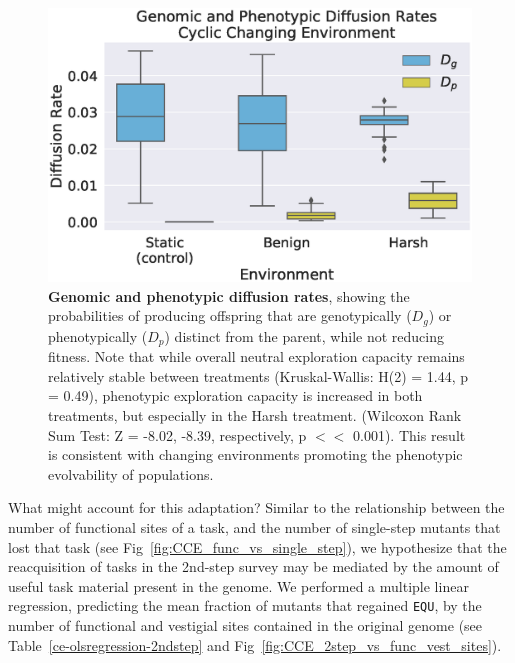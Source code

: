 \documentclass[10pt,letterpaper,final]{article}
\begin{document}
	\begin{figure}[!h] %
	\includegraphics[width=0.95\columnwidth]{figures/CE/fig13.eps}
	\caption{\textbf{Genomic and phenotypic diffusion rates}, showing the probabilities of producing offspring that are genotypically ($D_g$) or phenotypically ($D_p$) distinct from the parent, while not reducing fitness.
	Note that while overall neutral exploration capacity remains relatively stable between treatments (Kruskal-Wallis: H(2) = 1.44, p = 0.49), phenotypic exploration capacity is increased in both treatments, but especially in the Harsh treatment. (Wilcoxon Rank Sum Test: Z = -8.02, -8.39, respectively, p $<<$ 0.001). This result is consistent with changing environments promoting the phenotypic evolvability of populations.
	}\label{fig:CCE_diffusion_rate}
	\end{figure}
What might account for this adaptation? Similar to the relationship between the number of functional sites of a task, and the number of single-step mutants that lost that task (see Fig~\ref{fig:CCE_func_vs_single_step}), we hypothesize that the reacquisition of tasks in the 2nd-step survey may be mediated by the amount of useful task material present in the genome. We performed a multiple linear regression, predicting the mean fraction of mutants that regained \texttt{EQU}, by the number of functional and vestigial sites contained in the original genome (see Table~\ref{ce-olsregression-2ndstep} and Fig~\ref{fig:CCE_2step_vs_func_vest_sites}).
\end{document}
